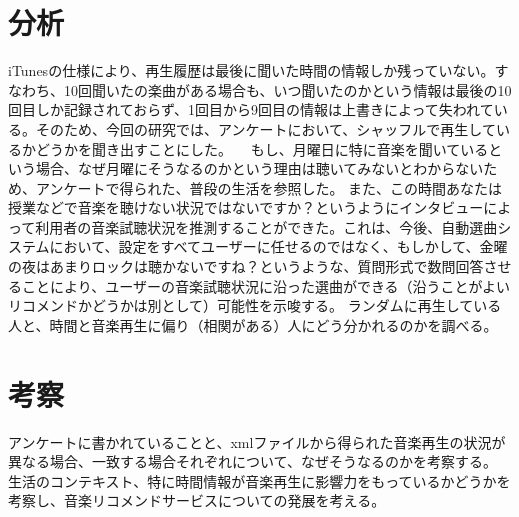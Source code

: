 \documentclass{jsarticle}
\begin{document}
\section{分析}
iTunesの仕様により、再生履歴は最後に聞いた時間の情報しか残っていない。すなわち、10回聞いたの楽曲がある場合も、いつ聞いたのかという情報は最後の10回目しか記録されておらず、1回目から9回目の情報は上書きによって失われている。そのため、今回の研究では、アンケートにおいて、シャッフルで再生しているかどうかを聞き出すことにした。
　もし、月曜日に特に音楽を聞いているという場合、なぜ月曜にそうなるのかという理由は聴いてみないとわからないため、アンケートで得られた、普段の生活を参照した。
また、この時間あなたは授業などで音楽を聴けない状況ではないですか？というようにインタビューによって利用者の音楽試聴状況を推測することができた。これは、今後、自動選曲システムにおいて、設定をすべてユーザーに任せるのではなく、もしかして、金曜の夜はあまりロックは聴かないですね？というような、質問形式で数問回答させることにより、ユーザーの音楽試聴状況に沿った選曲ができる（沿うことがよいリコメンドかどうかは別として）可能性を示唆する。
ランダムに再生している人と、時間と音楽再生に偏り（相関がある）人にどう分かれるのかを調べる。

\section{考察}
アンケートに書かれていることと、xmlファイルから得られた音楽再生の状況が異なる場合、一致する場合それぞれについて、なぜそうなるのかを考察する。
生活のコンテキスト、特に時間情報が音楽再生に影響力をもっているかどうかを考察し、音楽リコメンドサービスについての発展を考える。
\end{document}

